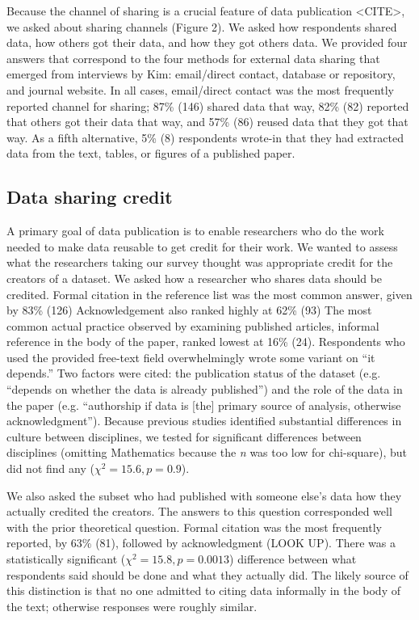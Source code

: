 \documentclass[10pt]{article}
\begin{document}
Because the channel of sharing is a crucial feature of data publication <CITE>, we asked about sharing channels (Figure 2).
We asked how respondents shared data, how others got their data, and how they got others data.
We provided four answers that correspond to the four methods for external data sharing that emerged from interviews by Kim\cite{kim_institutional_2012}: email/direct contact, database or repository, and journal website.
In all cases, email/direct contact was the most frequently reported channel for sharing; 87\% (146) shared data that way, 82\% (82) reported that others got their data that way, and 57\% (86) reused data that they got that way.
As a fifth alternative, 5\% (8) respondents wrote-in that they had extracted data from the text, tables, or figures of a published paper.

\subsection*{Data sharing credit}

A primary goal of data publication is to enable researchers who do the work needed to make data reusable to get credit for their work.
We wanted to assess what the researchers taking our survey thought was appropriate credit for the creators of a dataset.
We asked how a researcher who shares data should be credited.
Formal citation in the reference list was the most common answer, given by 83\% (126)
Acknowledgement also ranked highly at 62\% (93)
The most common actual practice observed by examining published articles, informal reference in the body of the paper\cite{sieber_not_1995, mooney_anatomy_2012}, ranked lowest at 16\% (24).
Respondents who used the provided free-text field overwhelmingly wrote some variant on ``it depends.''
Two factors were cited: the publication status of the dataset (e.g. ``depends on whether the data is already published'') and the role of the data in the paper (e.g. ``authorship if data is [the] primary source of analysis, otherwise acknowledgment'').
Because previous studies identified substantial differences in culture between disciplines\cite{harley_assessing_2010, swan_share_2008}, we tested for significant differences between disciplines (omitting Mathematics because the \emph{n} was too low for chi-square), but did not find any ($\chi^{2}= 15.6, p= 0.9$).

We also asked the subset who had published with someone else's data how they actually credited the creators.
The answers to this question corresponded well with the prior theoretical question.
Formal citation was the most frequently reported, by 63\% (81), followed by acknowledgment (LOOK UP).
There was a statistically significant ($\chi^{2}= 15.8, p= 0.0013$) difference between what respondents said should be done and what they actually did.
The likely source of this distinction is that no one admitted to citing data informally in the body of the text; otherwise responses were roughly similar.
\end{document}
